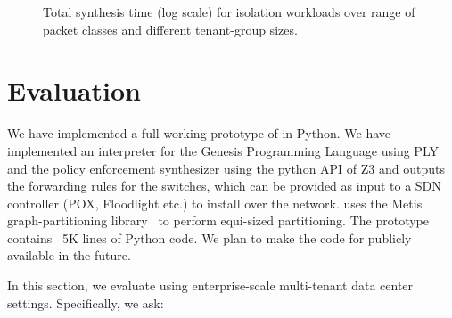 \begin{figure*}
	\centering
	\caption{\label{fig:isolation}
		Total synthesis time (log scale) for isolation workloads over range of packet classes and different tenant-group sizes.}
\end{figure*}

\section{Evaluation}
We have implemented a full working prototype of \Name in Python. We have
implemented an interpreter for the Genesis Programming Language using 
PLY\cite{ply} and the policy enforcement synthesizer using the python API of Z3
and outputs the forwarding rules for the switches, which can be provided
as input to a SDN controller (POX, Floodlight etc.) to install over the network. \Name
uses the Metis graph-partitioning library~\cite{metis} to perform equi-sized partitioning.
The prototype contains ~5K lines of Python code.  We
plan to make the code for \Name publicly available in the future. 

In this section, we evaluate \Name using
enterprise-scale multi-tenant data
center settings. 
Specifically, we ask:

